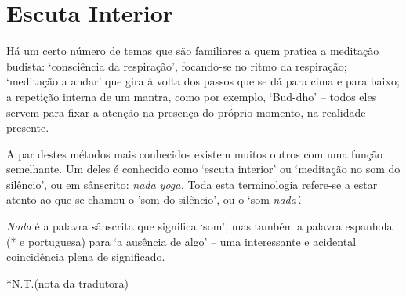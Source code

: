\chapter{Escuta Interior}

Há um certo número de temas que são familiares a quem pratica a
meditação budista: `consciência da respiração', focando-se no ritmo da
respiração; `meditação a andar' que gira à volta dos passos que se dá
para cima e para baixo; a repetição interna de um mantra, como por
exemplo, `Bud-dho' -- todos eles servem para fixar a atenção na presença
do próprio momento, na realidade presente.

A par destes métodos mais conhecidos existem muitos outros com uma
função semelhante. Um deles é conhecido como `escuta interior' ou
`meditação no som do silêncio', ou em sânscrito: \emph{nada yoga.} Toda
esta terminologia refere-se a estar atento ao que se chamou o 'som do
silêncio', ou o `som \emph{nada'.}

\emph{Nada} é a palavra sânscrita que significa `som', mas também a
palavra espanhola (* e portuguesa) para `a ausência de algo' -- uma
interessante e acidental coincidência plena de significado.

*N.T.(nota da tradutora)
